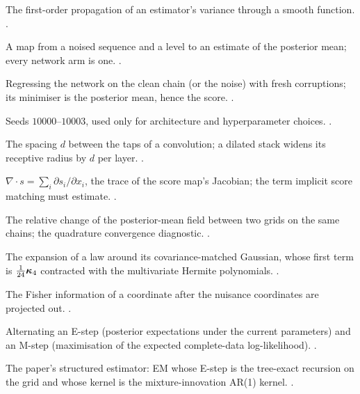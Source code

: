 \begin{description}[leftmargin=1.6em,itemsep=0.25em,font=\normalfont\bfseries]
\item[Delta method] The first-order propagation of an estimator's variance through a
smooth function. .

\item[Denoiser] A map from a noised sequence and a level to an estimate of the posterior
mean; every network arm is one. .

\item[Denoising score matching] Regressing the network on the clean chain (or the noise)
with fresh corruptions; its minimiser is the posterior mean, hence the score.
.

\item[Development seeds] Seeds $10000$--$10003$, used only for architecture and
hyperparameter choices. .

\item[Dilation] The spacing $d$ between the taps of a convolution; a dilated stack widens
its receptive radius by $d$ per layer. .

\item[Divergence] $\nabla\cdot s=\sum_i\partial s_i/\partial x_i$, the trace of the score
map's Jacobian; the term implicit score matching must estimate. .

\item[Drift (grid)] The relative change of the posterior-mean field between two grids on
the same chains; the quadrature convergence diagnostic. .

\item[Edgeworth correction] The expansion of a law around its covariance-matched Gaussian,
whose first term is $\tfrac1{24}\bm{\kappa}_4$ contracted with the multivariate Hermite
polynomials. .

\item[Efficient information] The Fisher information of a coordinate after the nuisance
coordinates are projected out. .

\item[EM (expectation--maximisation)] Alternating an E-step (posterior expectations under
the current parameters) and an M-step (maximisation of the expected complete-data
log-likelihood). .

\item[EM--BP] The paper's structured estimator: EM whose E-step is the tree-exact
recursion on the grid and whose kernel is the mixture-innovation AR(1) kernel.
.


\end{description}
